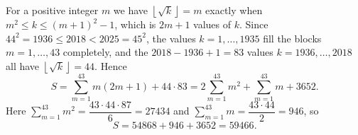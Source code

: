 For a positive integer $m$ we have $\left\lfloor\sqrt k\right\rfloor=m$ exactly when $m^2\le k\le(m+1)^2-1$, which is $2m+1$ values of $k$. Since $44^2=1936\le2018<2025=45^2$, the values $k=1,\dots,1935$ fill the blocks $m=1,\dots,43$ completely, and the $2018-1936+1=83$ values $k=1936,\dots,2018$ all have $\left\lfloor\sqrt k\right\rfloor=44$. Hence
\[
S=\sum_{m=1}^{43}m(2m+1)+44\cdot83=2\sum_{m=1}^{43}m^2+\sum_{m=1}^{43}m+3652 .
\]
Here $\displaystyle\sum_{m=1}^{43}m^2=\dfrac{43\cdot44\cdot87}{6}=27434$ and $\displaystyle\sum_{m=1}^{43}m=\dfrac{43\cdot44}{2}=946$, so
\[
S=54868+946+3652=\boxed{59466}.
\]
